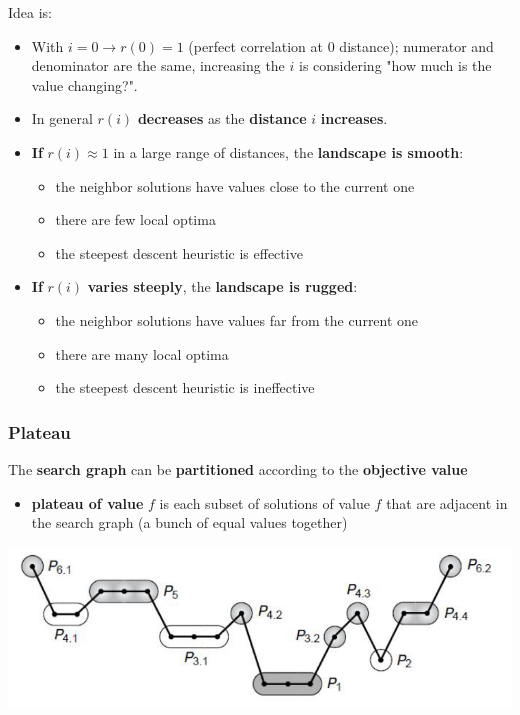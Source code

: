 Idea is:
\begin{itemize}
	\item With $i=0 \rightarrow r (0) = 1$ (perfect correlation at $0$ distance); numerator and denominator are the same, increasing the $i$ is considering "how much is the value changing?".\\
	
	\item In general $r (i)$ \textbf{decreases} as the \textbf{distance} $i$ \textbf{increases}.\\
	
	\item \textbf{If} $r (i) \approx 1$ in a large range of distances, the \textbf{landscape is smooth}:
	\begin{itemize}
		\item the neighbor solutions have values close to the current one
		\item there are few local optima
		\item the steepest descent heuristic is effective
	\end{itemize}
	\nn
	
	\item \textbf{If} $r (i)$ \textbf{varies steeply}, the \textbf{landscape is rugged}:
	\begin{itemize}
		\item the neighbor solutions have values far from the current one
		\item there are many local optima
		\item the steepest descent heuristic is ineffective
	\end{itemize}
	\nn
\end{itemize}

\newpage

\subsubsection{Plateau}
The \textbf{search graph} can be \textbf{partitioned} according to the \textbf{objective value}
\begin{itemize}
	\item \textbf{plateau of value} $f$ is each subset of solutions of value $f$ that are adjacent in the search graph (a bunch of equal values together)
\end{itemize}
\begin{center}
	\includegraphics[width=0.7\columnwidth]{img/plateau1}
\end{center}

